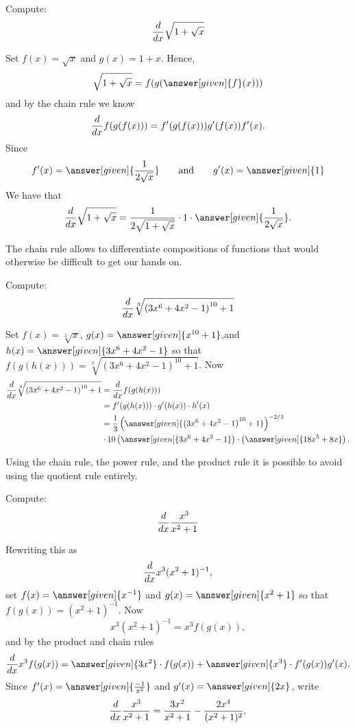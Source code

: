 \documentclass{ximera}
\begin{document}
\begin{example}
Compute:
\[
\frac{d}{\mathop{}\!d x} \sqrt{1+\sqrt{x}}
\]

\begin{explanation}
Set 
$f(x)=\sqrt{x}$ and $g(x)=1+x$. Hence,
\[
\sqrt{1+\sqrt{x}}=f(g(\answer[given]{f}(x)))
\]
and by the chain rule we know
\[
\frac{d}{\mathop{}\!d x} f(g(f(x))) = f'(g(f(x)))g'(f(x))f'(x).
\]
Since 
\[
f'(x) = \answer[given]{\frac{1}{2\sqrt{x}}} \qquad\text{and}\qquad g'(x) = \answer[given]{1}
\]
We have that
\[
\ddx \sqrt{1+\sqrt{x}} = \frac{1}{2\sqrt{1+\sqrt{x}}}\cdot 1\cdot  \answer[given]{\frac{1}{2\sqrt{x}}}.
\]
\end{explanation}
\end{example}

The chain rule allows to differentiate compositions of functions that
would otherwise be difficult to get our hands on.

\begin{example}
Compute:
\[
\frac{d}{\mathop{}\!d x} \sqrt[3]{\left(3x^6+4x^2-1\right)^{10} + 1 }
\]

\begin{explanation}
Set $f(x) = \sqrt[3]{x}$, $g(x) = \answer[given]{x^{10}+1}$,and $h(x) = \answer[given]{3x^6+4x^2-1}$
so that $f(g(h(x))) = \sqrt[3]{\left(3x^6+4x^2-1\right)^{10} + 1 }$. Now
\begin{align*}
  \ddx \sqrt[3]{\left(3x^6+4x^2-1\right)^{10} + 1 } &= \ddx f(g(h(x)))\\
  &= f'(g(h(x))) \cdot g'(h(x)) \cdot h'(x)\\
  &= \frac{1}{3}\left(\answer[given]{\left(3x^6+4x^2-1\right)^{10} + 1}\right)^{-2/3} \\ & \cdot 10 \left(\answer[given]{3x^6+4x^2-1}\right) \cdot \left(\answer[given]{18x^5+8x}\right).
\end{align*}
\end{explanation}
\end{example}




Using the chain rule, the power rule, and the product rule it is
possible to avoid using the quotient rule entirely.

\begin{example}
Compute:
\[
\frac{d}{\mathop{}\!d x} \frac{x^3}{x^2+1} 
\] 

\begin{explanation}
Rewriting this as 
\[
\frac{d}{\mathop{}\!d x} x^3(x^2+1)^{-1}, 
\]
set $f(x) = \answer[given]{x^{-1}}$ and $g(x) = \answer[given]{x^2+1}$ so that $f(g(x)) = (x^2 + 1)^{-1}$. Now
\[
x^3(x^2+1)^{-1} = x^3 f(g(x)),
\]
and by the product and chain rules
\[
\ddx x^3 f(g(x)) = \answer[given]{3x^2} \cdot f(g(x))+ \answer[given]{x^3} \cdot f'(g(x))g'(x).
\]
Since $f'(x) = \answer[given]{\frac{-1}{x^2}}$ and $g'(x) = \answer[given]{2x}$, write
\[
\frac{d}{\mathop{}\!d x} \frac{x^3}{x^2+1} = \frac{3x^2}{x^2+1}-\frac{2x^4}{(x^2+1)^2}.
\]
\end{explanation}
\end{example}
\end{document}
